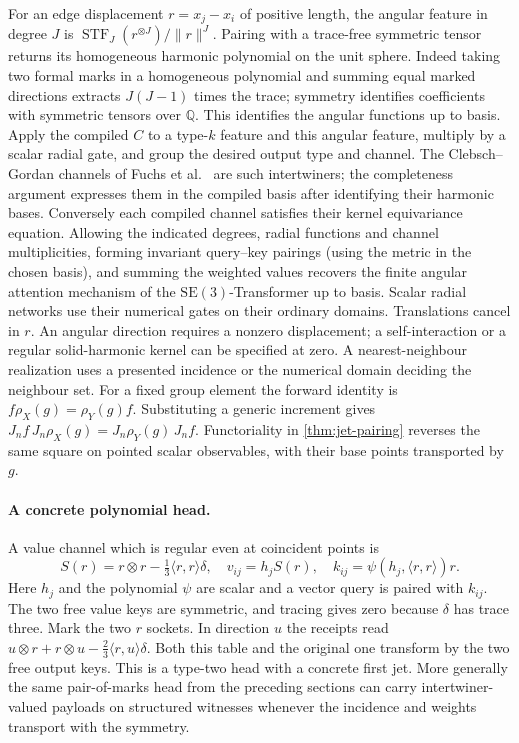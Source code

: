 \documentclass[11pt,a4paper]{article}
\theoremstyle{definition}
\theoremstyle{remark}\newaliascnt{remark}{theorem}
\newcommand{\Q}{\mathbb Q}
\newcommand{\STF}{\operatorname{STF}}
\numberwithin{equation}{section}
\begin{document}
For an edge displacement $r=x_j-x_i$ of positive length, the angular feature in degree $J$ is $\STF_J(r^{\otimes J})/\|r\|^J$. Pairing with a trace-free symmetric tensor returns its homogeneous harmonic polynomial on the unit sphere. Indeed taking two formal marks in a homogeneous polynomial and summing equal marked directions extracts $J(J-1)$ times the trace; symmetry identifies coefficients with symmetric tensors over $\Q$. This identifies the angular functions up to basis. Apply the compiled $C$ to a type-$k$ feature and this angular feature, multiply by a scalar radial gate, and group the desired output type and channel. The Clebsch--Gordan channels of Fuchs et al.~\cite[Appendix B]{se3} are such intertwiners; the completeness argument expresses them in the compiled basis after identifying their harmonic bases. Conversely each compiled channel satisfies their kernel equivariance equation. Allowing the indicated degrees, radial functions and channel multiplicities, forming invariant query--key pairings (using the metric in the chosen basis), and summing the weighted values recovers the finite angular attention mechanism of the $\mathrm{SE}(3)$-Transformer up to basis. Scalar radial networks use their numerical gates on their ordinary domains. Translations cancel in $r$. An angular direction requires a nonzero displacement; a self-interaction or a regular solid-harmonic kernel can be specified at zero. A nearest-neighbour realization uses a presented incidence or the numerical domain deciding the neighbour set.
For a fixed group element the forward identity is \(f\rho_X(g)=\rho_Y(g)f\). Substituting a generic increment gives \(J_nf\,J_n\rho_X(g)=J_n\rho_Y(g)\,J_nf\). Functoriality in \cref{thm:jet-pairing} reverses the same square on pointed scalar observables, with their base points transported by \(g\).
\paragraph{A concrete polynomial head.}
A value channel which is regular even at coincident points is
\[
 S(r)=r\otimes r-\tfrac13\langle r,r\rangle\delta,\quad
 v_{ij}=h_j S(r),\quad
 k_{ij}=\psi(h_j,\langle r,r\rangle)r.
\]
Here $h_j$ and the polynomial $\psi$ are scalar and a vector query is paired with $k_{ij}$. The two free value keys are symmetric, and tracing gives zero because $\delta$ has trace three. Mark the two $r$ sockets. In direction $u$ the receipts read $u\otimes r+r\otimes u-\tfrac23\langle r,u\rangle\delta$. Both this table and the original one transform by the two free output keys. This is a type-two head with a concrete first jet. More generally the same pair-of-marks head from the preceding sections can carry intertwiner-valued payloads on structured witnesses whenever the incidence and weights transport with the symmetry.
\end{document}
